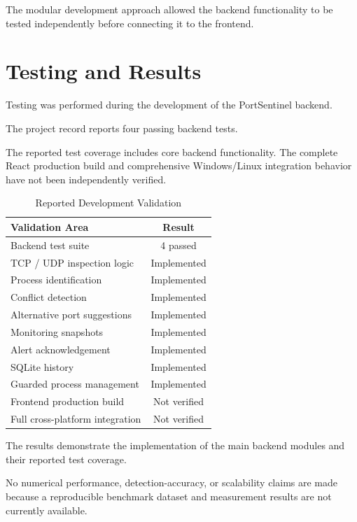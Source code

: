 \documentclass[conference]{IEEEtran}
\begin{document}
The modular development approach allowed the
backend functionality to be tested independently
before connecting it to the frontend.

\section{Testing and Results}

Testing was performed during the development of
the PortSentinel backend.

The project record reports four passing backend
tests.

The reported test coverage includes core backend
functionality. The complete React production build
and comprehensive Windows/Linux integration
behavior have not been independently verified.

\begin{table}[!t]
\centering
\caption{Reported Development Validation}
\label{tab:testing}

\begin{tabular}{|p{}|c|}
\hline
\textbf{Validation Area} & \textbf{Result}\\
\hline
Backend test suite & 4 passed\\
\hline
TCP / UDP inspection logic & Implemented\\
\hline
Process identification & Implemented\\
\hline
Conflict detection & Implemented\\
\hline
Alternative port suggestions & Implemented\\
\hline
Monitoring snapshots & Implemented\\
\hline
Alert acknowledgement & Implemented\\
\hline
SQLite history & Implemented\\
\hline
Guarded process management & Implemented\\
\hline
Frontend production build & Not verified\\
\hline
Full cross-platform integration & Not verified\\
\hline
\end{tabular}
\end{table}

The results demonstrate the implementation of the
main backend modules and their reported test
coverage.

No numerical performance, detection-accuracy,
or scalability claims are made because a
reproducible benchmark dataset and measurement
results are not currently available.
\end{document}
